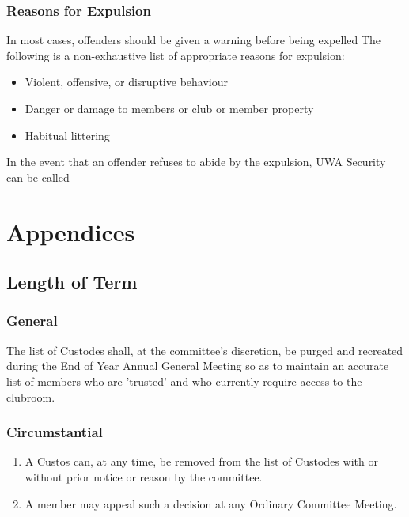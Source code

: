 \documentclass[10pt,a4paper]{report}
\begin{document}
		\subsection{Reasons for Expulsion}
		In most cases, offenders should be given a warning before being expelled
		The following is a non-exhaustive list of appropriate reasons for expulsion:
		\begin{itemize}
			\item Violent, offensive, or disruptive behaviour
			\item Danger or damage to members or club or member property
			\item Habitual littering
		\end{itemize}
		In the event that an offender refuses to abide by the expulsion, UWA Security can be called
		
		
	\chapter{Appendices}
		\section{Length of Term}
		\subsection{General}
		The list of Custodes shall, at the committee's discretion, be purged and recreated during the End of Year Annual General Meeting so as to maintain an accurate list of members who are 'trusted' and who currently require access to the clubroom.
		\subsection{Circumstantial}
		\begin{enumerate}
			\item A Custos can, at any time, be removed from the list of Custodes with or without prior notice or reason by the committee.
			\item A member may appeal such a decision at any Ordinary Committee Meeting.
		\end{enumerate}
		
\end{document}
